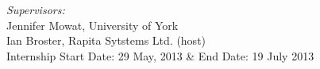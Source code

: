 \documentclass[11pt,a4paper]{report}
\begin{document}
\begin{titlepage}
\bigskip
     
     {\fontsize{12}{22}\selectfont \it {Supervisors:} }\\[0.5\baselineskip]    
     {\fontsize{13}{23}\selectfont Jennifer Mowat, University of York }\\[0.5\baselineskip]
    {\fontsize{13}{23}\selectfont Ian Broster, Rapita Sytstems Ltd. (host)}\\[2\baselineskip]
    
    \bigskip\bigskip\bigskip
     {\fontsize{13}{23}\selectfont Internship Start Date:  29 May, 2013 \& End Date: 19 July 2013 }\\[0.5\baselineskip]
 
  \end{titlepage}
 
  
\end{document}
